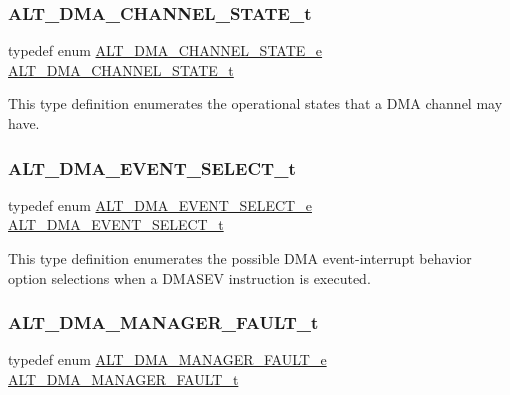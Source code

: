 \subsubsection{\texorpdfstring{ALT\_DMA\_CHANNEL\_STATE\_t}{ALT\_DMA\_CHANNEL\_STATE\_t}}
{\footnotesize\ttfamily typedef enum \mbox{\hyperlink{group__ALT__DMA__CSR_ga9d1bf45cfd52c9e0c603c1462b32ea50}{A\+L\+T\+\_\+\+D\+M\+A\+\_\+\+C\+H\+A\+N\+N\+E\+L\+\_\+\+S\+T\+A\+T\+E\+\_\+e}}
 \mbox{\hyperlink{group__ALT__DMA__CSR_gaf21ed0aa09d2ac7cdbdf56da958e0b1a}{A\+L\+T\+\_\+\+D\+M\+A\+\_\+\+C\+H\+A\+N\+N\+E\+L\+\_\+\+S\+T\+A\+T\+E\+\_\+t}}}

This type definition enumerates the operational states that a D\+MA channel may have. \mbox{\label{group__ALT__DMA__CSR_gae4b36b414418458c2b8a3c2931a37a49}} 
\subsubsection{\texorpdfstring{ALT\_DMA\_EVENT\_SELECT\_t}{ALT\_DMA\_EVENT\_SELECT\_t}}
{\footnotesize\ttfamily typedef enum \mbox{\hyperlink{group__ALT__DMA__CSR_gaa5ef1fd8005d9b58f8da859d6a7c32c2}{A\+L\+T\+\_\+\+D\+M\+A\+\_\+\+E\+V\+E\+N\+T\+\_\+\+S\+E\+L\+E\+C\+T\+\_\+e}}
 \mbox{\hyperlink{group__ALT__DMA__CSR_gae4b36b414418458c2b8a3c2931a37a49}{A\+L\+T\+\_\+\+D\+M\+A\+\_\+\+E\+V\+E\+N\+T\+\_\+\+S\+E\+L\+E\+C\+T\+\_\+t}}}

This type definition enumerates the possible D\+MA event-\/interrupt behavior option selections when a D\+M\+A\+S\+EV instruction is executed. \mbox{\label{group__ALT__DMA__CSR_gaca87b43fe85277c9791fe8f3c4d574a3}} 
\subsubsection{\texorpdfstring{ALT\_DMA\_MANAGER\_FAULT\_t}{ALT\_DMA\_MANAGER\_FAULT\_t}}
{\footnotesize\ttfamily typedef enum \mbox{\hyperlink{group__ALT__DMA__CSR_gab44582b3022f4047c4cdd70b80155e44}{A\+L\+T\+\_\+\+D\+M\+A\+\_\+\+M\+A\+N\+A\+G\+E\+R\+\_\+\+F\+A\+U\+L\+T\+\_\+e}}
 \mbox{\hyperlink{group__ALT__DMA__CSR_gaca87b43fe85277c9791fe8f3c4d574a3}{A\+L\+T\+\_\+\+D\+M\+A\+\_\+\+M\+A\+N\+A\+G\+E\+R\+\_\+\+F\+A\+U\+L\+T\+\_\+t}}}

